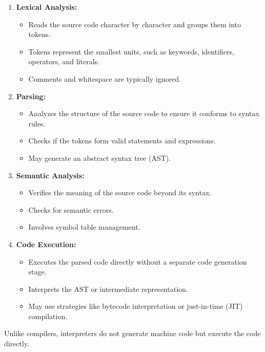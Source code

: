 \begin{enumerate}
    \item \textbf{Lexical Analysis:}
    \begin{itemize}
        \item Reads the source code character by character and groups them into tokens.
        \item Tokens represent the smallest units, such as keywords, identifiers, operators, and literals.
        \item Comments and whitespace are typically ignored.
    \end{itemize}
    \item \textbf{Parsing:}
    \begin{itemize}
        \item Analyzes the structure of the source code to ensure it conforms to syntax rules.
        \item Checks if the tokens form valid statements and expressions.
        \item May generate an abstract syntax tree (AST).
    \end{itemize}
    \item \textbf{Semantic Analysis:}
    \begin{itemize}
        \item Verifies the meaning of the source code beyond its syntax.
        \item Checks for semantic errors.
        \item Involves symbol table management.
    \end{itemize}
    \item \textbf{Code Execution:}
    \begin{itemize}
        \item Executes the parsed code directly without a separate code generation stage.
        \item Interprets the AST or intermediate representation.
        \item May use strategies like bytecode interpretation or just-in-time (JIT) compilation.
    \end{itemize}
\end{enumerate}

Unlike compilers, interpreters do not generate machine code but execute the code directly.

